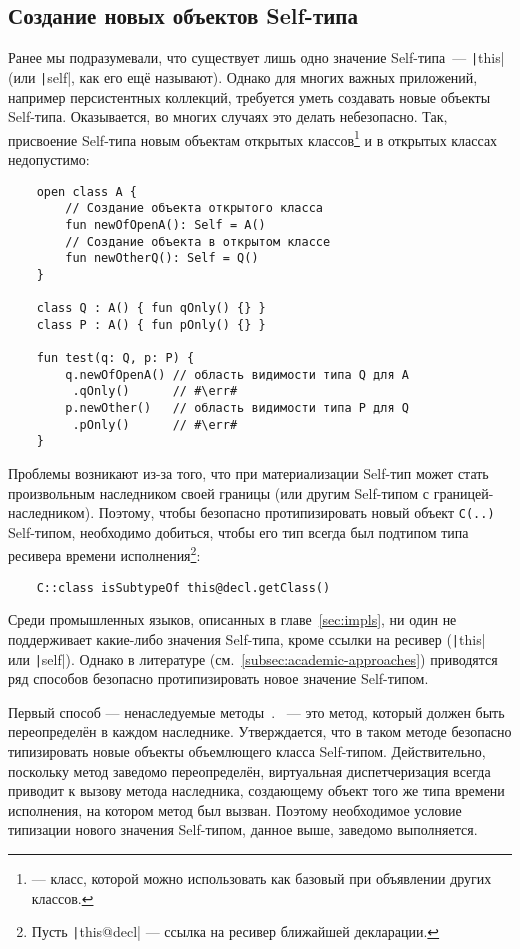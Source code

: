 \subsection{Создание новых объектов Self-типа} \label{subsec:new}

Ранее мы подразумевали, что существует лишь одно значение Self-типа~--- \texttt|this| (или \texttt|self|, как его ещё называют).
Однако для многих важных приложений, например персистентных коллекций, требуется уметь создавать новые объекты Self-типа.
Оказывается, во многих случаях это делать небезопасно.
Так, присвоение Self-типа новым объектам открытых классов\footnote{ --- класс, которой можно использовать как базовый при объявлении других классов.} и в открытых классах недопустимо:

\begin{verbatim}
    open class A {
        // Создание объекта открытого класса
        fun newOfOpenA(): Self = A()
        // Создание объекта в открытом классе
        fun newOtherQ(): Self = Q()
    }

    class Q : A() { fun qOnly() {} }
    class P : A() { fun pOnly() {} }

    fun test(q: Q, p: P) {
        q.newOfOpenA() // область видимости типа Q для A
         .qOnly()      // #\err#
        p.newOther()   // область видимости типа P для Q
         .pOnly()      // #\err#
    }
\end{verbatim}

Проблемы возникают из-за того, что при материализации Self-тип может стать произвольным наследником своей границы (или другим Self-типом с границей-наследником).
Поэтому, чтобы безопасно протипизировать новый объект \texttt{C(..)} Self-типом, необходимо добиться, чтобы его тип всегда был подтипом типа ресивера времени исполнения\footnote{Пусть \texttt|this@decl| --- ссылка на ресивер ближайшей декларации.\label{foot:this-decl}}:
\begin{verbatim}
    C::class isSubtypeOf this@decl.getClass()
\end{verbatim}

Среди промышленных языков, описанных в главе~\ref{sec:impls}, ни один не поддерживает какие-либо значения Self-типа, кроме ссылки на ресивер (\texttt|this| или \texttt|self|).
Однако в литературе (см.~\ref{subsec:academic-approaches}) приводятся ряд способов безопасно протипизировать новое значение Self-типом.

Первый способ --- ненаследуемые методы~\cite{saito2009matching}.
~--- это метод, который должен быть переопределён в каждом наследнике.
Утверждается, что в таком методе безопасно типизировать новые объекты объемлющего класса Self-типом.
Действительно, поскольку метод заведомо переопределён, виртуальная диспетчеризация всегда приводит к вызову метода наследника, создающему объект того же типа времени исполнения, на котором метод был вызван.
Поэтому необходимое условие типизации нового значения Self-типом, данное выше, заведомо выполняется.

